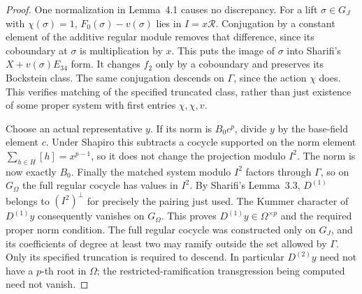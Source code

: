 \begin{proof}
One normalization in Lemma~4.1 causes no discrepancy.
For a lift \(\sigma\in G_J\) with \(\chi(\sigma)=1\),
\(F_0(\sigma)-v(\sigma)\) lies in \(I=x\mathcal R\).
Conjugation by a constant element of the additive
regular module removes that difference, since its
coboundary at \(\sigma\) is multiplication by \(x\).
This puts the image of \(\sigma\) into Sharifi's
\(X+v(\sigma)E_{34}\) form.  It changes \(f_2\)
only by a coboundary and preserves its Bockstein class.
The same conjugation descends on \(\Gamma\), since
the action \(\chi\) does.  This verifies matching of
the specified truncated class, rather than just
existence of some proper system with first entries
\(\chi,\chi,v\).

Choose an actual representative \(y\).  If its norm is
\(B_0c^p\), divide \(y\) by the base-field element \(c\).
Under Shapiro this subtracts a cocycle supported on
the norm element
\(\sum_{h\in H}[h]=x^{p-1}\), so it does not change
the projection modulo \(I^2\).  The norm is now
exactly \(B_0\).  Finally the matched system modulo
\(I^2\) factors through \(\Gamma\), so on \(G_\Omega\)
the full regular cocycle has values in \(I^2\).
By Sharifi's Lemma~3.3, \(D^{(1)}\) belongs to
\((I^2)^\perp\) for precisely the pairing just used.
The Kummer character of \(D^{(1)}y\) consequently
vanishes on \(G_\Omega\).  This proves
\(D^{(1)}y\in\Omega^{\times p}\) and the required
proper norm condition.
The full regular cocycle was constructed only on
\(G_J\), and its coefficients of degree at least two
may ramify outside the set allowed by \(\Gamma\).
Only its specified truncation is required to descend.
In particular \(D^{(2)}y\) need not have a \(p\)-th
root in \(\Omega\); the restricted-ramification
transgression being computed need not vanish.
\end{proof}

